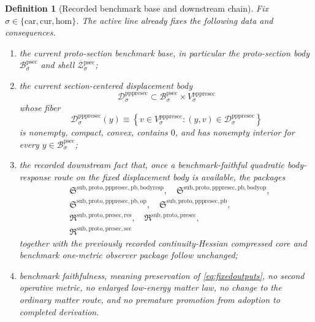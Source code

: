 \documentclass[11pt]{article}
\newcommand{\Car}{\mathrm{car}}
\newcommand{\Cur}{\mathrm{cur}}
\newcommand{\Hom}{\mathrm{hom}}
\newcommand{\ProtoSectionBody}[1]{\mathcal B_{#1}^{\mathrm{psec}}}
\newcommand{\ProtoSectionShell}[1]{\mathcal Z_{#1}^{\mathrm{psec}}}
\newcommand{\PrePreProtoSectionVertical}[1]{V_{#1}^{\mathrm{pppresec}}}
\newcommand{\PrePreProtoSectionResidualBody}[1]{\mathcal D_{#1}^{\mathrm{pppresec}}}
\newcommand{\PullbackBodyResponseCore}{\mathfrak S^{\mathrm{sub,proto,pppresec,pb,bodyresp}}}
\newcommand{\PullbackBodyOperatorCore}{\mathfrak S^{\mathrm{sub,proto,pppresec,pb,bodyop}}}
\newcommand{\PullbackOperatorCore}{\mathfrak S^{\mathrm{sub,proto,pppresec,pb,op}}}
\newcommand{\PrePreProtoSectionPullbackCore}{\mathfrak S^{\mathrm{sub,proto,pppresec,pb}}}
\newcommand{\PreProtoSectionResidualPackage}{\mathfrak R^{\mathrm{sub,proto,presec,res}}}
\newcommand{\PreProtoSectionPackage}{\mathfrak R^{\mathrm{sub,proto,presec}}}
\newcommand{\PreProtoSectionMinSectionCore}{\mathfrak R^{\mathrm{sub,proto,presec,sec}}}
\newtheorem{definition}{Definition}
\begin{document}
\begin{definition}[Recorded benchmark base and downstream chain]
\label{def:downstream}
Fix \(\sigma\in\{\Car,\Cur,\Hom\}\). The active line already fixes the following data and consequences.
\begin{enumerate}
    \item the current proto-section benchmark base, in particular the proto-section body \(\ProtoSectionBody{\sigma}\) and shell \(\ProtoSectionShell{\sigma}\);
    \item the current section-centered displacement body
    \[
    \PrePreProtoSectionResidualBody{\sigma}
    \subset
    \ProtoSectionBody{\sigma}\times\PrePreProtoSectionVertical{\sigma}
    \]
    whose fiber
    \[
    \PrePreProtoSectionResidualBody{\sigma}(y)
    \equiv
    \left\{
    v\in\PrePreProtoSectionVertical{\sigma}:(y,v)\in\PrePreProtoSectionResidualBody{\sigma}
    \right\}
    \]
    is nonempty, compact, convex, contains \(0\), and has nonempty interior for every \(y\in\ProtoSectionBody{\sigma}\);
    \item the recorded downstream fact that, once a benchmark-faithful quadratic body-response route on the fixed displacement body is available, the packages
    \[
    \begin{aligned}
    &\PullbackBodyResponseCore,\quad \PullbackBodyOperatorCore,\\
    &\PullbackOperatorCore,\quad \PrePreProtoSectionPullbackCore,\\
    &\PreProtoSectionResidualPackage,\quad \PreProtoSectionPackage,\\
    &\PreProtoSectionMinSectionCore
    \end{aligned}
    \]
    together with the previously recorded continuity-Hessian compressed core and benchmark one-metric observer package follow unchanged;
    \item benchmark faithfulness, meaning preservation of \eqref{eq:fixedoutputs}, no second operative metric, no enlarged low-energy matter law, no change to the ordinary matter route, and no premature promotion from adoption to completed derivation.
\end{enumerate}
\end{definition}
\end{document}
